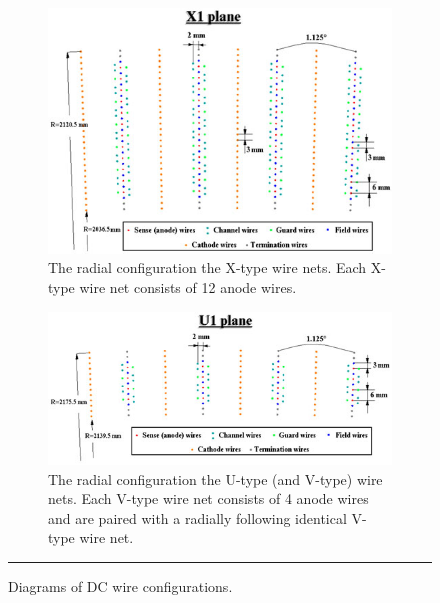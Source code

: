 \begin{figure}[H]
    \ContinuedFloat %
\begin{subfigure}[p]{1\textwidth}
  \centering
    \includegraphics[width=1\textwidth]{Figures/DCX1net.jpg}

  \caption{The radial configuration the X-type wire nets. Each X-type wire net consists of 12 anode wires.}
  \label{fig:X1dcdiagram}
\end{subfigure}

\begin{subfigure}[p]{1\textwidth}
  \centering
    \includegraphics[width=1\textwidth]{Figures/DCU1net.jpg}
    
  \caption{The radial configuration the U-type (and V-type) wire nets. Each V-type wire net consists of 4 anode wires and are paired with a radially following identical V-type wire net. }
  \label{fig:U1dcdiagram}
\end{subfigure}
\rule{35em}{0.5pt}
\caption[Diagrams of DC wire configurations.]{Diagrams of DC wire configurations.}
\label{fig:dcdiagram}
\end{figure}
